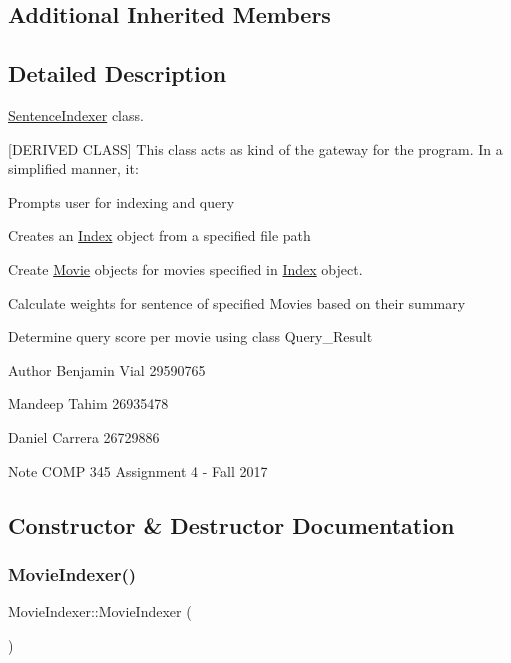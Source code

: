 \subsection*{Additional Inherited Members}


\subsection{Detailed Description}
\hyperlink{class_sentence_indexer}{Sentence\+Indexer} class. 

\mbox{[}D\+E\+R\+I\+V\+ED C\+L\+A\+SS\mbox{]} This class acts as kind of the gateway for the program. In a simplified manner, it\+:
\begin{DoxyItemize}
\item Prompts user for indexing and query
\item Creates an \hyperlink{class_index}{Index} object from a specified file path
\item Create \hyperlink{class_movie}{Movie} objects for movies specified in \hyperlink{class_index}{Index} object.
\item Calculate weights for sentence of specified Movies based on their summary
\item Determine query score per movie using class Query\+\_\+\+Result
\end{DoxyItemize}

\begin{DoxyAuthor}{Author}
Benjamin Vial 29590765 

Mandeep Tahim 26935478 

Daniel Carrera 26729886
\end{DoxyAuthor}
\begin{DoxyNote}{Note}
C\+O\+MP 345 Assignment 4 -\/ Fall 2017 
\end{DoxyNote}


\subsection{Constructor \& Destructor Documentation}
\mbox{\label{class_movie_indexer_abbec3abae682cf2ef8605b5fae8916a6}} 
\subsubsection{\texorpdfstring{Movie\+Indexer()}{MovieIndexer()}\hspace{0.1cm}{\footnotesize\ttfamily [1/2]}}
{\footnotesize\ttfamily Movie\+Indexer\+::\+Movie\+Indexer (\begin{DoxyParamCaption}{ }\end{DoxyParamCaption})\hspace{0.3cm}{\ttfamily [inline]}}



